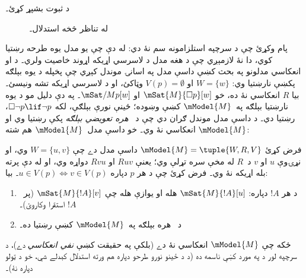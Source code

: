 \documentclass[../../../include/open-logic-section]{subfiles}
\begin{document}
\begin{prob}
  د  ثبوت بشپړ کړئ۔
\end{prob}

\begin{figure}
  \begin{center}
  \end{center}
\caption{له تناظر څخه استدلال۔}
\end{figure}

پام وکړئ چې د  سرچپه استلزامونه سم نۀ دي:
له دې چې يو مدل يوه طرحه رښتيا کوي، دا نۀ لازمېږي چې د هغه مدل د
لاسرسي اړيکه اړوند خاصيت ولري۔ د  او انعکاسي مدلونو په بحث کښې
داسې مدل په اسانۍ موندل کېږي چې پخپله د  يوه بېلګه پکښې
نارښتيا وي: $W = \{w\}$ او $V(p) = \emptyset$ وټاکئ، او د لاسرسي
اړيکه تشه ونيسئ۔ بيا $R$ انعکاسي نۀ ده، خو
$\mSat{M}{\Box p}[w]$ او $\mSat/{M}{p}[w]$۔ په دې دليل مو د 
يوه نارښتيا بېلګه په~$\mModel{M}$ کښې وښوده؛ ځينې نورې بېلګې، لکه
$\Box \lnot p \lif \lnot p$، رښتيا دي۔ د داسې مدل موندل ګران دي
چې د~ \emph{هره تعويضي بېلګه} پکې رښتيا وي او
$\mModel{M}$ انعکاسي نۀ وي۔ خو داسې مدل~$\mModel{M}$ هم شته:

\begin{prop}
  فرض کړئ $\mModel{M} = \tuple{W, R, V}$ داسې مدل دے چې
  $W = \{u, v \}$ وي، او نړۍوې $u$ او $v$ د~$R$ له مخې سره تړلې
  وي؛ يعنې $Ruv$ او $Rvu$ دواړه وي، او له دې پرته بله اړيکه نۀ وي۔
  فرض کړئ چې د هر $p$ دپاره $u \in V(p) \Leftrightarrow v
  \in V(p)$۔ بيا:
  \begin{enumerate}
  \item د هر $!A$ دپاره: $\mSat{M}{!A}[u]$ هله او يوازې هله چې
    $\mSat{M}{!A}[v]$ (پر~$!A$ استقرا وکاروئ)۔
  \item د~ هره بېلګه په~$\mModel{M}$ کښې رښتيا ده۔
  \end{enumerate}
  ځکه چې $\mModel{M}$ انعکاسي نۀ دے (بلکې په حقيقت کښې
  \emph{نفي انعکاسي} دے)، د  سرچپه لور
  د  په مورد کښې ناسمه ده (د
   د ځينو نورو طرحو دپاره هم ورته استدلال
  کېدلے شي، خو د ټولو دپاره نۀ)۔
\end{prop}
\end{document}
